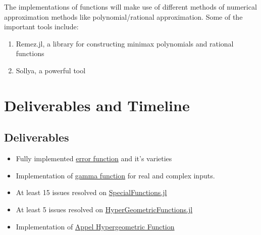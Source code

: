 \documentclass{article}
\theoremstyle{mytheoremstyle}
\theoremstyle{mytheoremstyle}
\theoremstyle{myproblemstyle}
\begin{document}
      The implementations of functions will make use of different methods  of numerical approximation methods like polynomial/rational approximation. 
      Some of the important tools include: \begin{enumerate}
        \item Remez.jl, a library for constructing minimax polynomials and rational functions 
        \item Sollya, a powerful tool 
      \end{enumerate}
    
  \section*{Deliverables and Timeline}\label{sec:Methods} %
    \subsection*{Deliverables}
      \begin{itemize}
        \item Fully implemented \href{https://github.com/JuliaMath/SpecialFunctions.jl/blob/master/src/erf.jl}{error function} and it's varieties 
        \item Implementation of \href{https://github.com/JuliaMath/SpecialFunctions.jl/blob/master/src/gamma.jl}{gamma function} for real and complex inputs. 
        \item At least 15 issues resolved on \href{https://github.com/JuliaMath/SpecialFunctions.jl/issues}{SpecialFunctions.jl} 
        \item At least 5 issues resolved on \href{https://github.com/JuliaMath/HypergeometricFunctions.jl/issues}{HyperGeometricFunctions.jl} 
        \item Implementation of \href{https://en.wikipedia.org/wiki/Appell_series}{Appel Hypergeometric Function} 
      \end{itemize}
\end{document}
